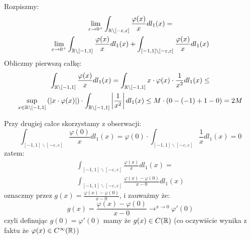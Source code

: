 \documentclass[11pt]{scrartcl}
\begin{document}
    \begin{walk}
        \item Rozpiszmy:
            \begin{gather*}
                \lim_{\varepsilon \to 0^+} \int_{\mathbb R \backslash [-\varepsilon, \varepsilon]} 
                    \frac{\varphi (x)}{x} dl_1 (x) = \\
                \lim_{\varepsilon \to 0^+} 
                    \int_{\mathbb R \backslash [-1,1]} \frac{\varphi (x)}{x} dl_1 (x) +
                    \int_{[-1,1] \backslash [-\varepsilon, \varepsilon]} \frac{\varphi (x)}{x} dl_1 (x)
            \end{gather*}
            Obliczmy pierwszą całkę:
            \begin{gather*}
                \int_{\mathbb R \backslash [-1,1]} \frac{\varphi (x)}{x} dl_1 (x) = 
                \int_{\mathbb R \backslash [-1,1]} x \cdot \varphi (x) \cdot \frac{1}{x^2} dl_1(x) \leq \\
                \sup_{x \in \mathbb R \backslash [-1, 1]} \left ( \left\lvert x \cdot \varphi (x) \right\rvert \right ) \cdot  
                    \int_{\mathbb R \backslash [-1,1]} \left\lvert \frac{1}{x^2} \right\rvert dl_1 (x) \leq
                M \cdot (0 - (-1) + 1 - 0) = 2M
            \end{gather*}
            
            Przy drugiej całce skorzystamy z obserwacji:
            \[
                \int_{[-1,1] \backslash [-\varepsilon, \varepsilon]} \frac{\varphi (0)}{x} dl_1 (x) =
                \varphi (0) \cdot \int_{[-1,1] \backslash [-\varepsilon, \varepsilon]} \frac{1}{x} dl_1 (x) = 0 
            \]
            zatem:
            \begin{gather*}
                \int_{[-1,1] \backslash [-\varepsilon, \varepsilon]} \frac{\varphi (x)}{x} dl_1 (x) = \\
                \int_{[-1,1] \backslash [-\varepsilon, \varepsilon]} 
                    \frac{\varphi (x) - \varphi (0)}{x - 0} dl_1 (x)
            \end{gather*}
            oznaczmy przez $g(x) = \frac{\varphi (x) - \varphi (0)}{x - 0}$, i zauważmy że:
            \[
                g(x) = \frac{\varphi (x) - \varphi (0)}{x - 0} \to^{x \to 0} \varphi' (0)
            \]
            czyli definując $g(0) = \varphi' (0)$ mamy że $g(x) \in C (\mathbb R)$ 
            (co oczywiście wynika z faktu że $\varphi (x) \in C^{\infty }(\mathbb R)$)


\end{walk}
\end{document}
